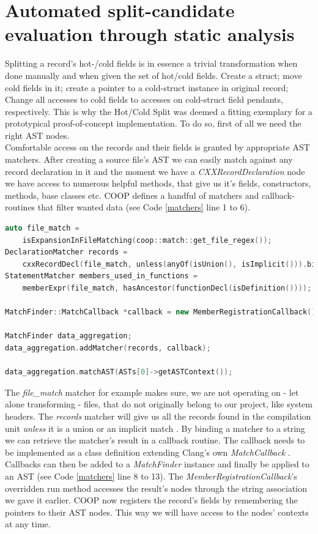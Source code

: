 \section{Automated split-candidate evaluation through static analysis}\label{auto_oop_to_dod}
Splitting a record's hot-/cold fields is in essence a trivial transformation when done manually and when given the set of hot/cold fields. Create a struct; move cold fields in it; create a pointer to a cold-struct instance in original record; Change all accesses to cold fields to accesses on cold-struct field pendants, respectively. This is why the Hot/Cold Split was deemed a fitting exemplary for a prototypical proof-of-concept implementation. To do so, first of all we need the right AST nodes.\\
Comfortable access on the records and their fields is granted by appropriate AST matchers. After creating a source file's AST we can easily match against any record declaration in it and the moment we have a \textit{CXXRecordDeclaration} node we have access to numerous helpful methods, that give us it's fields, constructors, methods, base classes etc. COOP defines a handful of matchers and callback-routines that filter wanted data (see Code \ref{matchers} line 1 to 6).
\begin{lstlisting}[language=C++,name={Some matchers used by COOP to filter relevant AST nodes and their utilization },label={matchers}]
auto file_match =
	isExpansionInFileMatching(coop::match::get_file_regex());
DeclarationMatcher records =
	cxxRecordDecl(file_match, unless(anyOf(isUnion(), isImplicit())).bind("record_binding");
StatementMatcher members_used_in_functions =
	memberExpr(file_match, hasAncestor(functionDecl(isDefinition())));

MatchFinder::MatchCallback *callback = new MemberRegistrationCallback();

MatchFinder data_aggregation;
data_aggregation.addMatcher(records, callback);

data_aggregation.matchAST(ASTs[0]->getASTContext());
\end{lstlisting}
The \textit{file\_match} matcher for example makes sure, we are not operating on - let alone transforming - files, that do not originally belong to our project, like system headers. The \textit{records} matcher will give us all the records found in the compilation unit \textit{unless} it is a union or an implicit match . By binding a matcher to a string we can retrieve the matcher's result in a callback routine. The callback needs to be implemented as a class definition extending Clang's own \textit{MatchCallback} . Callbacks can then be added to a \textit{MatchFinder} instance and finally be applied to an AST (see Code \ref{matchers} line 8 to 13). The \textit{MemberRegistrationCallback}'s overridden run method accesses the result's nodes through the string association we gave it earlier. COOP now registers the record's fields by remembering the pointers to their AST nodes. This way we will have access to the nodes' contexts at any time.\\\\
